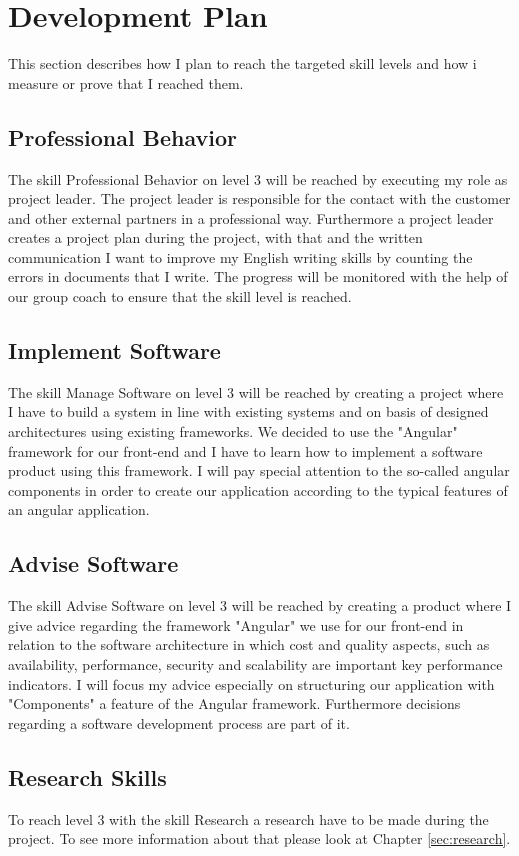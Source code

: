\section{Development Plan}
\label{sec:development}
This section describes how I plan to reach the targeted skill levels and how i measure or prove that I reached them.

\subsection{Professional Behavior}
The skill Professional Behavior on level 3 will be reached by executing my role as project leader. The project leader is responsible for the contact with the customer and other external partners in a professional way. 
\newline
Furthermore a project leader creates a project plan during the project, with that and the written communication I want to improve my English writing skills by counting the errors in documents that I write. The progress will be monitored with the help of our group coach to ensure that the skill level is reached.

\subsection{Implement Software}
The skill Manage Software on level 3 will be reached by creating a project where I have to build a system in line with existing systems and on basis of designed architectures 
using existing frameworks. We decided to use the "Angular" framework for our front-end and I have to learn how to implement a software product using this framework. I will pay special attention to the so-called angular components in order to create our application according to the typical features of an angular application. 

\subsection{Advise Software}
The skill Advise Software on level 3 will be reached by creating a product where I give advice regarding the framework "Angular" we use for our front-end in relation to the software architecture in which cost and quality aspects, such as availability, performance, security and scalability are important key performance indicators. I will focus my advice especially on structuring our application with "Components" a feature of  the Angular framework. Furthermore decisions regarding a software development process are part of it.   

\subsection{Research Skills}
To reach level 3 with the skill Research a research have to be made during the project. To see more information about that please look at Chapter \ref{sec:research}.